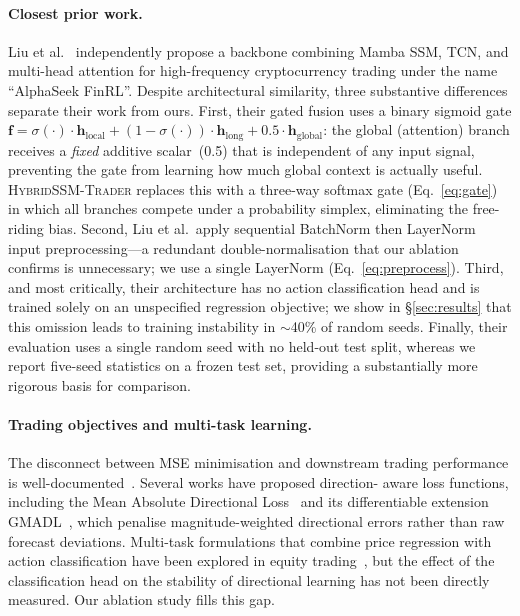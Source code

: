 \documentclass[runningheads]{llncs}
\begin{document}
\paragraph{Closest prior work.}
Liu et al.~\cite{liu2025alphaseek} independently propose a backbone combining
Mamba SSM, TCN, and multi-head attention for high-frequency cryptocurrency
trading under the name ``AlphaSeek FinRL''.  Despite architectural similarity,
three substantive differences separate their work from ours.
First, their gated fusion uses a binary sigmoid gate
$\mathbf{f} = \sigma(\cdot)\!\cdot\!\mathbf{h}_\text{local}
 + (1{-}\sigma(\cdot))\!\cdot\!\mathbf{h}_\text{long}
 + 0.5\!\cdot\!\mathbf{h}_\text{global}$:
the global (attention) branch receives a \emph{fixed} additive scalar~(0.5)
that is independent of any input signal, preventing the gate from learning
how much global context is actually useful.
\textsc{HybridSSM-Trader} replaces this with a three-way softmax gate
(Eq.~\ref{eq:gate}) in which all branches compete under a probability simplex,
eliminating the free-riding bias.
Second, Liu et al.\ apply sequential BatchNorm then LayerNorm input
preprocessing---a redundant double-normalisation that our ablation confirms
is unnecessary; we use a single LayerNorm (Eq.~\ref{eq:preprocess}).
Third, and most critically, their architecture has no action classification
head and is trained solely on an unspecified regression objective; we show
in \S\ref{sec:results} that this omission leads to training instability in
$\sim$40\% of random seeds.  Finally, their evaluation uses a single random
seed with no held-out test split, whereas we report five-seed statistics on
a frozen test set, providing a substantially more rigorous basis for comparison.

\paragraph{Trading objectives and multi-task learning.}
The disconnect between MSE minimisation and downstream trading performance is
well-documented~\cite{fischer2018deep}.  Several works have proposed direction-
aware loss functions, including the Mean Absolute Directional
Loss~\cite{michalikow2023madl} and its differentiable extension
GMADL~\cite{sakowski2024gmadl}, which penalise magnitude-weighted directional
errors rather than raw forecast deviations.  Multi-task formulations that
combine price regression with action classification have been explored in
equity trading~\cite{ding2015deep}, but the effect of the classification head on
the stability of directional learning has not been directly measured.  Our
ablation study fills this gap.
\end{document}
